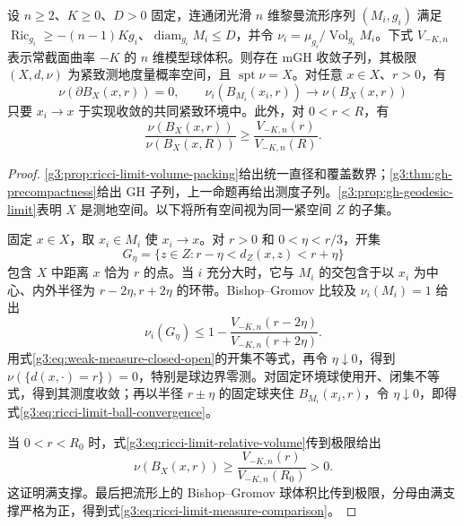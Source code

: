 \begin{theorem}\label{g3:thm:ricci-measured-precompactness}
	设 \(n\ge2\)、\(K\ge0\)、\(D>0\) 固定，连通闭光滑 \(n\) 维黎曼流形序列 \((M_i,g_i)\) 满足 \(\operatorname{Ric}_{g_i}\ge-(n-1)Kg_i\)、\(\operatorname{diam}_{g_i}M_i\le D\)，并令 \(\nu_i=\mu_{g_i}/\operatorname{Vol}_{g_i}M_i\)。下式 \(V_{-K,n}\) 表示常截面曲率 \(-K\) 的 \(n\) 维模型球体积。则存在 mGH 收敛子列，其极限 \((X,d,\nu)\) 为紧致测地度量概率空间，且 \(\operatorname{spt}\nu=X\)。对任意 \(x\in X\)、\(r>0\)，有
	\begin{equation}\label{g3:eq:ricci-limit-ball-convergence}
		\nu(\partial B_X(x,r))=0,
		\qquad \nu_i(B_{M_i}(x_i,r))\longrightarrow\nu(B_X(x,r))
	\end{equation}
	只要 \(x_i\to x\) 于实现收敛的共同紧致环境中。此外，对 \(0<r<R\)，有
	\begin{equation}\label{g3:eq:ricci-limit-measure-comparison}
		\frac{\nu(B_X(x,r))}{\nu(B_X(x,R))}
		\ge\frac{V_{-K,n}(r)}{V_{-K,n}(R)}.
	\end{equation}
\end{theorem}
\begin{proof}
	\cref{g3:prop:ricci-limit-volume-packing}给出统一直径和覆盖数界；\cref{g3:thm:gh-precompactness}给出 GH 子列，上一命题再给出测度子列。\cref{g3:prop:gh-geodesic-limit}表明 \(X\) 是测地空间。以下将所有空间视为同一紧空间 \(Z\) 的子集。

	固定 \(x\in X\)，取 \(x_i\in M_i\) 使 \(x_i\to x\)。对 \(r>0\) 和 \(0<\eta<r/3\)，开集
	\[
		G_\eta=\{z\in Z:r-\eta<d_Z(x,z)<r+\eta\}
	\]
	包含 \(X\) 中距离 \(x\) 恰为 \(r\) 的点。当 \(i\) 充分大时，它与 \(M_i\) 的交包含于以 \(x_i\) 为中心、内外半径为 \(r-2\eta,r+2\eta\) 的环带。Bishop--Gromov 比较及 \(\nu_i(M_i)=1\) 给出
	\[
		\nu_i(G_\eta)
		\le 1-\frac{V_{-K,n}(r-2\eta)}{V_{-K,n}(r+2\eta)}.
	\]
	用式\eqref{g3:eq:weak-measure-closed-open}的开集不等式，再令 \(\eta\downarrow0\)，得到 \(\nu(\{d(x,\cdot)=r\})=0\)，特别是球边界零测。对固定环境球使用开、闭集不等式，得到其测度收敛；再以半径 \(r\pm\eta\) 的固定球夹住 \(B_{M_i}(x_i,r)\)，令 \(\eta\downarrow0\)，即得式\eqref{g3:eq:ricci-limit-ball-convergence}。

	当 \(0<r<R_0\) 时，式\eqref{g3:eq:ricci-limit-relative-volume}传到极限给出
	\[
		\nu(B_X(x,r))\ge
		\frac{V_{-K,n}(r)}{V_{-K,n}(R_0)}>0.
	\]
	这证明满支撑。最后把流形上的 Bishop--Gromov 球体积比传到极限，分母由满支撑严格为正，得到式\eqref{g3:eq:ricci-limit-measure-comparison}。
\end{proof}


